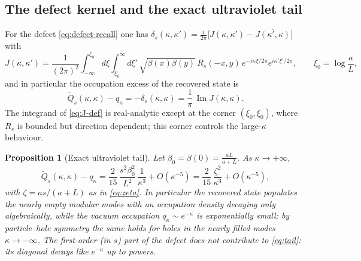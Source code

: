 \documentclass[11pt]{article}
\theoremstyle{accent}
\newtheorem{proposition}[theorem]{Proposition}
\theoremstyle{definition}
\begin{document}
\subsection{The defect kernel and the exact ultraviolet tail}

For the defect \eqref{eq:defect-recall} one has \(\delta_s(\kappa,\kappa')=\frac{i}{2\pi}\bigl[J(\kappa,\kappa')-\overline{J(\kappa',\kappa)}\bigr]\) with
\begin{equation}\label{eq:J-def}
 J(\kappa,\kappa')=\frac{1}{(2\pi)^2}\int_{-\infty}^{\xi_0}\!d\xi\int_{\xi_0}^{\infty}\!d\xi'\,
 \sqrt{\beta(x)\beta(y)}\,R_s(-x,y)\,e^{-i\kappa\xi/2\pi}e^{i\kappa'\xi'/2\pi},
 \qquad \xi_0=\log\frac aL,
\end{equation}
and in particular the occupation excess of the recovered state is
\begin{equation}\label{eq:occupation}
 \widetilde Q_s(\kappa,\kappa)-q_\kappa=-\delta_s(\kappa,\kappa)=\frac1\pi\,\operatorname{Im}J(\kappa,\kappa).
\end{equation}
The integrand of \eqref{eq:J-def} is real-analytic except at the corner \((\xi_0,\xi_0)\), where \(R_s\) is bounded but direction dependent; this corner controls the large-\(\kappa\) behaviour.

\begin{proposition}[Exact ultraviolet tail]\label{prop:tail}
Let \(\beta_0=\beta(0)=\frac{aL}{a+L}\).  As \(\kappa\to+\infty\),
\begin{equation}\label{eq:tail}
 \boxed{\;
 \widetilde Q_s(\kappa,\kappa)-q_\kappa
 =\frac{2}{15}\,\frac{s^2\beta_0^2}{L^2}\,\frac1{\kappa^3}+O(\kappa^{-5})
 =\frac{2}{15}\,\frac{\zeta^2}{\kappa^3}+O(\kappa^{-5}),\;}
\end{equation}
with \(\zeta=as/(a+L)\) as in \eqref{eq:zeta}.  In particular the recovered state populates the nearly empty modular modes with an occupation density decaying only algebraically, while the vacuum occupation \(q_\kappa\sim e^{-\kappa}\) is exponentially small; by particle--hole symmetry the same holds for holes in the nearly filled modes \(\kappa\to-\infty\).  The first-order (in \(s\)) part of the defect does not contribute to \eqref{eq:tail}: its diagonal decays like \(e^{-\kappa}\) up to powers.
\end{proposition}
\end{document}
